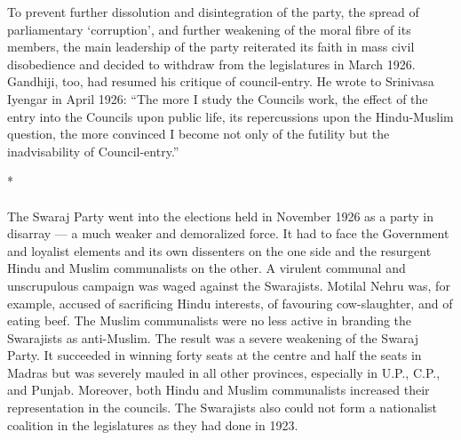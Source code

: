 \begin{multicols}{2}
To prevent further dissolution and disintegration of the party, the spread of parliamentary `corruption', and further weakening of the moral fibre of its members, the main leadership of the party reiterated its faith in mass civil disobedience and decided to withdraw from the legislatures in March 1926. Gandhiji, too, had resumed his critique of council-entry. He wrote to Srinivasa Iyengar in April 1926: ``The more I study the Councils work, the effect of the entry into the Councils upon public life, its repercussions upon the Hindu-Muslim question, the more convinced I become not only of the futility but the inadvisability of Council-entry.''

\begin{center}*\end{center}

\paragraph*{}
The Swaraj Party went into the elections held in November 1926 as a party in disarray --- a much weaker and demoralized force. It had to face the Government and loyalist elements and its own dissenters on the one side and the resurgent Hindu and Muslim communalists on the other. A virulent communal and unscrupulous campaign was waged against the Swarajists. Motilal Nehru was, for example, accused of sacrificing Hindu interests, of favouring cow-slaughter, and of eating beef. The Muslim communalists were no less active in branding the Swarajists as anti-Muslim. The result was a severe weakening of the Swaraj Party. It succeeded in winning forty seats at the centre and half the seats in Madras but was severely mauled in all other provinces, especially in U.P., C.P., and Punjab. Moreover, both Hindu and Muslim communalists increased their representation in the councils. The Swarajists also could not form a nationalist coalition in the legislatures as they had done in 1923.


\end{multicols}
